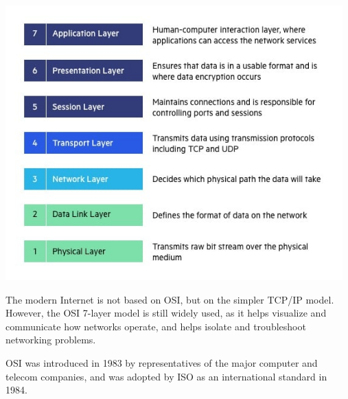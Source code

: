 \documentclass[a4paper,12pt]{article}
\begin{document}
\includegraphics[width=13cm]{./OSI-7-layers.jpg}

The modern Internet is not based on OSI, but on the simpler TCP/IP model. However, the OSI 7-layer model is still widely used, as it helps visualize and communicate how networks operate, and helps isolate and troubleshoot networking problems.

OSI was introduced in 1983 by representatives of the major computer and telecom companies, and was adopted by ISO as an international standard in 1984.


\clearpage
\printindex
\end{document}
